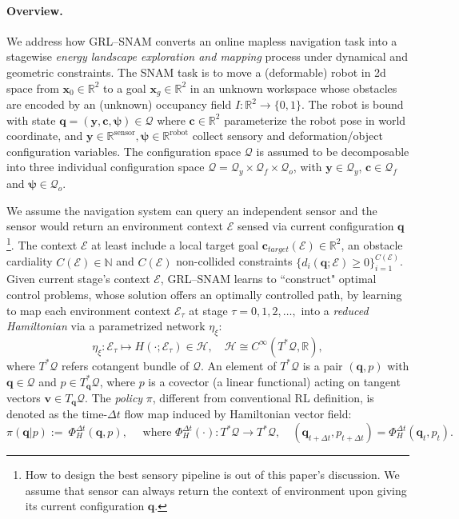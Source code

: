 \documentclass{article} %
\let\vec=\boldsymbol
\begin{document}



\paragraph{Overview.} 
We address how GRL--SNAM converts an online mapless navigation task into a stagewise {\emph{energy landscape exploration and mapping}} process under dynamical and geometric constraints. The SNAM task is to move a (deformable) robot in 2d space from $\vec x_0\in\mathbb R^2$ to a goal $\vec x_g\in\mathbb R^2$ in an unknown workspace whose obstacles are encoded by an (unknown) occupancy field $I:\mathbb R^2\to\{0,1\}$. The robot is bound with state $\vec q=(\vec y, \vec c, \vec\psi)\in \mathcal{Q}$ where $\vec c\in\mathbb R^2$ parameterize the robot pose in world coordinate, and $\vec y\in \mathbb{R}^{\text{sensor}},\vec\psi\in \mathbb{R}^{\text{robot}}$ collect sensory and deformation/object configuration variables. The configuration space $\mathcal{Q}$ is assumed to be decomposable into three individual configuration space $\mathcal{Q}=\mathcal{Q}_y\times \mathcal{Q}_f\times \mathcal{Q}_o$, with $\vec{y}\in\mathcal{Q}_y$, $\vec{c}\in \mathcal{Q}_f$ and $\vec\psi\in\mathcal{Q}_o$.

{ We assume the navigation system can query an independent sensor and the sensor would return an environment context $\mathcal{E}$ sensed via current configuration} $\vec{q}$\footnote{How to design the best sensory pipeline is out of this paper's discussion. We assume that sensor can always return the context of environment upon giving {its current} configuration $\vec{q}$.}. The context $\mathcal{E}$ at least include a local target goal $\vec{c}_{target}(\mathcal{E})\in \mathbb{R}^{2}$,  an obstacle cardiality $C(\mathcal{E})\in \mathbb{N}$ and $C(\mathcal{E})$ non-collided constraints $\{d_i(\vec{q};\mathcal{E})\geq 0\}_{i=1}^{C(\mathcal{E})}$. Given current stage's context $\mathcal{E}$, GRL--SNAM learns to ``construct" optimal control problems, whose solution offers an optimally controlled path, by learning to map each environment context $\mathcal E_\tau$ at stage $\tau=0,1,2,\ldots,$ into a \textit{reduced Hamiltonian} via a parametrized network $\eta_{\xi}$:
\[
\eta_{\xi}:\mathcal E_\tau \longmapsto H(\cdot;\mathcal E_\tau)\in \mathscr H,
\quad 
\mathscr H\cong C^{\infty}(T^{*}\mathcal{Q},\mathbb{R}),
\]
where $T^{*}\mathcal{Q}$ refers cotangent bundle of $\mathcal{Q}$. An element of $T^{*}\mathcal{Q}$ is a pair $(\vec{q},p)$ with $\vec{q}\in \mathcal{Q}$ and $p\in T^{*}_{\vec{q}}\mathcal{Q}$, where $p$ is a covector (a linear functional)
acting on tangent vectors $\vec{v}\in T_{\vec{q}}\mathcal{Q}$. The \emph{policy} $\pi$, different from conventional RL definition, is denoted as the time-$\Delta t$ flow map induced by Hamiltonian vector field:
\begin{equation}
\pi(\vec{q}|p):=\ \Phi^{\Delta t}_{H}(\vec{q},p),\quad \text{ where } \Phi^{\Delta t}_{H}(\cdot):T^*\mathcal{Q}\to T^*
\mathcal{Q},
\quad (\vec{q}_{t+\Delta t},p_{t+\Delta t})=\Phi^{\Delta t}_{H}(\vec{q}_{t},p_{t}).
\end{equation}
\end{document}

